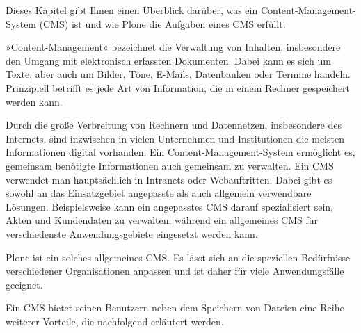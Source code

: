 \documentclass[a4paper,12pt,ngerman]{manual}
\begin{document}
Dieses Kapitel gibt Ihnen einen Überblick darüber, was ein
Content-Management-System (CMS) ist und wie Plone die Aufgaben eines CMS
erfüllt.

»Content-Management« bezeichnet die Verwaltung von Inhalten,
insbesondere den Umgang mit elektronisch erfassten Dokumenten. Dabei
kann es sich um Texte, aber auch um Bilder, Töne, E-Mails, Datenbanken
oder Termine handeln. Prinzipiell betrifft es jede Art von
Information, die in einem Rechner gespeichert werden kann.

Durch die große Verbreitung von Rechnern und Datennetzen, insbesondere
des Internets, sind inzwischen in vielen Unternehmen und Institutionen
die meisten Informationen digital vorhanden. Ein
Content-Management-System ermöglicht es, gemeinsam benötigte
Informationen auch gemeinsam zu verwalten. Ein CMS verwendet man
hauptsächlich in Intranets oder Webauftritten. Dabei gibt es sowohl
an das Einsatzgebiet angepasste als auch allgemein verwendbare
Lösungen. Beispielsweise kann ein angepasstes CMS darauf spezialisiert
sein, Akten und Kundendaten zu verwalten, während ein allgemeines CMS
für verschiedenste Anwendungsgebiete eingesetzt werden kann.

Plone ist ein solches allgemeines CMS. Es lässt sich an die speziellen
Bedürfnisse verschiedener Organisationen anpassen und ist daher für
viele Anwendungsfälle geeignet.

Ein CMS bietet seinen Benutzern neben dem Speichern von Dateien eine Reihe
weiterer Vorteile, die nachfolgend erläutert werden.
\end{document}
